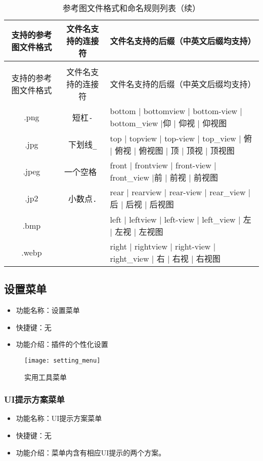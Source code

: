 \documentclass{../../public_resources/doc}
\begin{document}
\begin{longtable}{|*{2}{c|}m{210pt}|}
    \caption{参考图文件格式和命名规则列表} \\
    \hline
    支持的参考图文件格式 & 文件名支持的连接符 & 文件名支持的后缀（中英文后缀均支持） \\
    \hline
    \endfirsthead

    \caption{参考图文件格式和命名规则列表（续）} \\
    \hline
    支持的参考图文件格式 & 文件名支持的连接符 & 文件名支持的后缀（中英文后缀均支持） \\
    \hline
    \endhead

    .png & 短杠\lstinline|-| & bottom | bottomview | bottom-view | bottom\_view |仰 | 仰视 | 仰视图\\
    \hline
    .jpg & 下划线\lstinline|_| & top | topview | top-view | top\_view | 俯 | 俯视 | 俯视图 | 顶 | 顶视 | 顶视图 \\
    \hline
    .jpeg & 一个空格\lstinline| | & front | frontview | front-view | front\_view |前 | 前视 | 前视图 \\
    \hline
    .jp2 & 小数点\lstinline|.| & rear | rearview | rear-view | rear\_view | 后 | 后视 | 后视图 \\
    \hline
    .bmp &  & left | leftview | left-view | left\_view | 左 | 左视 | 左视图 \\
    \hline
    .webp &  & right | rightview | right-view | right\_view | 右 | 右视 | 右视图\\
    \hline
\end{longtable}

\subsection{设置菜单}
\begin{itemize}
    \item 功能名称：设置菜单
    \item 快捷键：无
    \item 功能介绍：插件的个性化设置
\end{itemize}

\begin{figure}[h!]
    \texttt{[image: setting\_menu]}
    \caption{实用工具菜单}
\end{figure}

\subsubsection{UI提示方案菜单}
\begin{itemize}
    \item 功能名称：UI提示方案菜单
    \item 快捷键：无
    \item 功能介绍：菜单内含有相应UI提示的两个方案。
\end{itemize}
\end{document}
